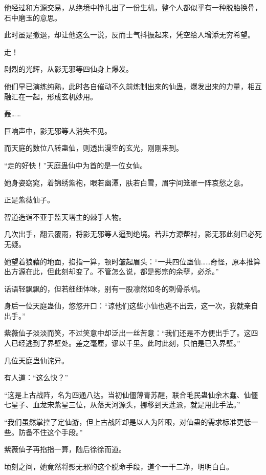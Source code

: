 \begin{this_body}
他经过和方源交易，从绝境中挣扎出了一份生机，整个人都似乎有一种脱胎换骨，石中磨玉的意思。

此时虽是撤退，却让他这么一说，反而士气抖振起来，凭空给人增添无穷希望。

走！

剧烈的光辉，从影无邪等四仙身上爆发。

他们早已演练纯熟，此时各自催动不久前炼制出来的仙蛊，爆发出来的力量，相互融汇在一起，形成玄机妙用。

轰……

巨响声中，影无邪等人消失不见。

而天庭的数位八转蛊仙，则透出漫空的玄光，刚刚来到。

“走的好快！”天庭蛊仙中为首的是一位女仙。

她身姿窈窕，着锦绣紫袍，眼若幽潭，肤若白雪，眉宇间笼罩一阵哀愁之意。

正是紫薇仙子。

智道造诣不亚于监天塔主的棘手人物。

几次出手，翻云覆雨，将影无邪等人逼到绝境。若非方源帮衬，影无邪此刻已必死无疑。

她望着狼藉的地面，掐指一算，顿时皱起眉头：“一共四位蛊仙……奇怪，原本推算出方源在此，但此刻却变了。不管怎么说，都是影宗的余孽，必杀。”

话语轻飘飘的，但若细细体味，别有一股凛然如冬的刺骨杀机。

身后一位天庭蛊仙，悠悠开口：“谅他们这些小仙也逃不出去，这一次，我就亲自出手。”

紫薇仙子淡淡而笑，不过笑意中却泛出一丝苦意：“我们还是不方便出手了。这四人已经逃到了界壁处。差之毫厘，谬以千里。此时此刻，只怕是已入界壁。”

几位天庭蛊仙诧异。

有人道：“这么快？”

“这是上古战阵，名为四通八达。当初仙僵薄青苏醒，联合毛民蛊仙余木蠢、仙僵七星子、血龙宋紫星三位，从落天河源头，挪移到天莲派，就是用此手法。”

“我们虽然掌控了定仙游，但上古战阵却是以人为阵眼，对仙蛊的需求标准更低一些。防备不住这个手段。”

紫薇仙子再掐指一算，随后徐徐而道。

顷刻之间，她竟然将影无邪的这个脱命手段，道个一干二净，明明白白。

\end{this_body}


